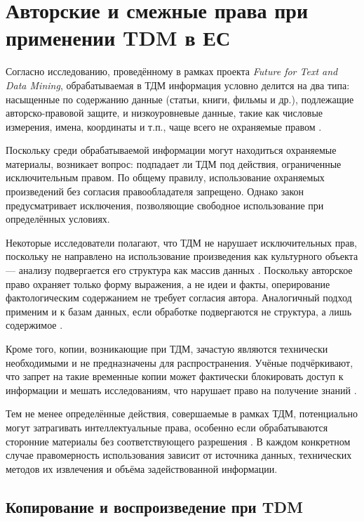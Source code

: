 \section{Авторские и смежные права при применении TDM в ЕС}

Согласно исследованию, проведённому в рамках проекта \textit{Future for Text
and Data Mining}, обрабатываемая в ТДМ информация условно делится на два типа:
насыщенные по содержанию данные (статьи, книги, фильмы и др.), подлежащие
авторско-правовой защите, и низкоуровневые данные, такие как числовые
измерения, имена, координаты и т.п., чаще всего не охраняемые правом
\cite{futuretdm}.

Поскольку среди обрабатываемой информации могут находиться охраняемые
материалы, возникает вопрос: подпадает ли ТДМ под действия, ограниченные
исключительным правом. По общему правилу, использование охраняемых произведений
без согласия правообладателя запрещено. Однако закон предусматривает
исключения, позволяющие свободное использование при определённых условиях.

Некоторые исследователи полагают, что ТДМ не нарушает исключительных прав,
поскольку не направлено на использование произведения как культурного объекта —
анализу подвергается его структура как массив данных \cite{muto2016,
geiger2020tdm}. Поскольку авторское право охраняет только форму выражения, а не
идеи и факты, оперирование фактологическим содержанием не требует согласия
автора. Аналогичный подход применим и к базам данных, если обработке
подвергаются не структура, а лишь содержимое \cite{geiger2020tdm}.

Кроме того, копии, возникающие при ТДМ, зачастую являются технически
необходимыми и не предназначены для распространения. Учёные подчёркивают, что
запрет на такие временные копии может фактически блокировать доступ к
информации и мешать исследованиям, что нарушает право на получение знаний
\cite{flynn2020}.

Тем не менее определённые действия, совершаемые в рамках ТДМ, потенциально
могут затрагивать интеллектуальные права, особенно если обрабатываются
сторонние материалы без соответствующего разрешения \cite{geiger2020tdm}. В
каждом конкретном случае правомерность использования зависит от источника
данных, технических методов их извлечения и объёма задействованной информации.

\subsection*{Копирование и воспроизведение при TDM}

